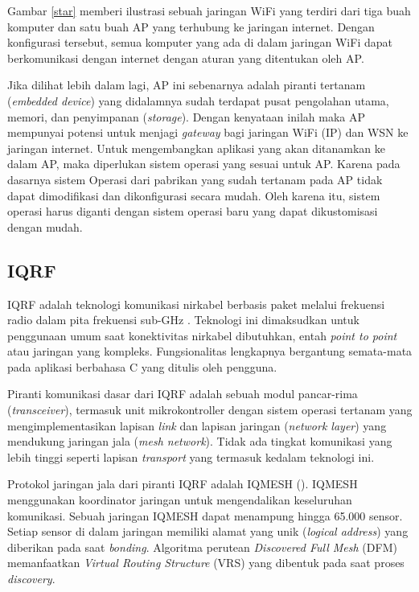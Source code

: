     Gambar \ref{star} memberi ilustrasi sebuah jaringan WiFi yang terdiri dari tiga buah komputer dan satu buah AP yang terhubung ke jaringan internet. Dengan konfigurasi tersebut, semua komputer yang ada di dalam jaringan WiFi dapat berkomunikasi dengan internet dengan aturan yang ditentukan oleh AP.

    Jika dilihat lebih dalam lagi, AP ini sebenarnya adalah piranti tertanam (\emph{embedded device}) yang didalamnya sudah terdapat pusat pengolahan utama, memori, dan penyimpanan (\emph{storage}). Dengan kenyataan inilah maka AP mempunyai potensi untuk menjagi \emph{gateway} bagi jaringan WiFi (IP) dan WSN ke jaringan internet. Untuk mengembangkan aplikasi yang akan ditanamkan ke dalam AP, maka diperlukan sistem operasi yang sesuai untuk AP. Karena pada dasarnya sistem Operasi dari pabrikan yang sudah tertanam pada AP tidak dapat dimodifikasi dan dikonfigurasi secara mudah. Oleh karena itu, sistem operasi harus diganti dengan sistem operasi baru yang dapat dikustomisasi dengan mudah.

  \subsection{IQRF}
    IQRF adalah teknologi komunikasi nirkabel berbasis paket melalui frekuensi radio dalam pita frekuensi sub-GHz \cite{MICRORISCs.r.o.2013,Sulc2011}. Teknologi ini dimaksudkan untuk penggunaan umum saat konektivitas nirkabel dibutuhkan, entah \emph{point to point} atau jaringan yang kompleks. Fungsionalitas lengkapnya bergantung semata-mata pada aplikasi berbahasa C yang ditulis oleh pengguna.

    Piranti komunikasi dasar dari IQRF adalah sebuah modul pancar-rima (\emph{transceiver}), termasuk unit mikrokontroller dengan sistem operasi tertanam yang mengimplementasikan lapisan \emph{link} dan lapisan jaringan (\emph{network layer}) yang mendukung jaringan jala (\emph{mesh network}). Tidak ada tingkat komunikasi yang lebih tinggi seperti lapisan \emph{transport} yang termasuk kedalam teknologi ini.

    Protokol jaringan jala dari piranti IQRF adalah IQMESH (\cite{Seflova2012}). IQMESH menggunakan koordinator jaringan untuk mengendalikan keseluruhan komunikasi. Sebuah jaringan IQMESH dapat menampung hingga 65.000 sensor. Setiap sensor di dalam jaringan memiliki alamat yang unik (\emph{logical address}) yang diberikan pada saat \emph{bonding}. Algoritma perutean \emph{Discovered Full Mesh} (DFM) memanfaatkan \emph{Virtual Routing Structure} (VRS) yang dibentuk pada saat proses \emph{discovery}.

